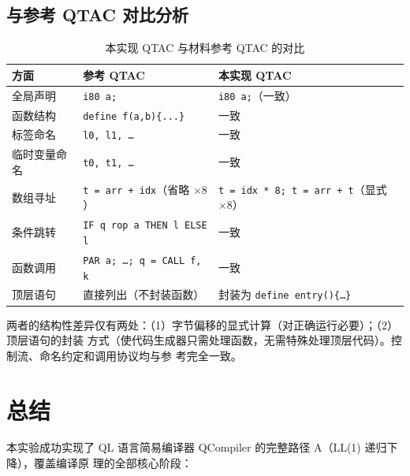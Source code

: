 \documentclass[12pt,a4paper]{ctexart}
\begin{document}
\subsection{与参考 QTAC 对比分析}

\begin{table}[H]
\centering
\caption{本实现 QTAC 与材料参考 QTAC 的对比}
\label{tab:qtac_cmp}
\begin{tabular}{lll}
\toprule
方面 & 参考 QTAC & 本实现 QTAC \\
\midrule
全局声明 & \texttt{i80 a;} & \texttt{i80 a;}（一致） \\
函数结构 & \texttt{define f(a,b)\{...\}} & 一致 \\
标签命名 & \texttt{l0, l1, \ldots} & 一致 \\
临时变量命名 & \texttt{t0, t1, \ldots} & 一致 \\
数组寻址 & \texttt{t = arr + idx}（省略 $\times 8$） & \texttt{t = idx * 8; t = arr + t}（显式 $\times 8$） \\
条件跳转 & \texttt{IF q rop a THEN l ELSE l} & 一致 \\
函数调用 & \texttt{PAR a; \ldots; q = CALL f, k} & 一致 \\
顶层语句 & 直接列出（不封装函数） & 封装为 \texttt{define entry()\{\ldots\}} \\
\bottomrule
\end{tabular}
\end{table}

两者的结构性差异仅有两处：（1）字节偏移的显式计算（对正确运行必要）；（2）顶层语句的封装
方式（使代码生成器只需处理函数，无需特殊处理顶层代码）。控制流、命名约定和调用协议均与参
考完全一致。

\section{总结}

本实验成功实现了 QL 语言简易编译器 QCompiler 的完整路径 A（LL(1) 递归下降），覆盖编译原
理的全部核心阶段：
\end{document}
